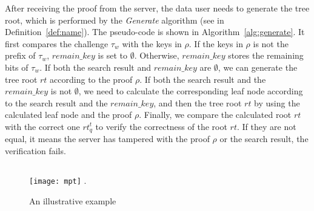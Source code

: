 After receiving the proof from the server, the data user needs to generate the tree root, which is performed by the {\it Generate} algorithm (see in Definition~\ref{def:name}). The pseudo-code is shown in Algorithm~\ref{alg:generate}. It first compares the challenge $\tau_{w}$ with the keys in $\rho$. If the keys in $\rho$ is not the prefix of $\tau_{w}$, $remain\_key$ is set to $\emptyset$. Otherwise, $remain\_key$ stores the remaining bits of $\tau_{w}$. If both the search result and $remain\_key$ are $\emptyset$, we can generate the tree root $rt$ according to the proof $\rho$. If both the search result and the $remain\_key$ is not $\emptyset$, we need to calculate the corresponding leaf node according to the search result and the $remain\_key$, and then  the tree root $rt$ by using the calculated leaf node and the proof $\rho$.  Finally, we compare the calculated root $rt$ with the correct one $rt^t_q$ to verify the correctness of the root $rt$. If they are not equal, it means the server has tampered with  the proof $\rho$ or the search result,  the verification fails.

\subsection{}

  \begin{figure*}[t]
  \centering
  \texttt{[image: mpt]}
  \DeclareGraphicsExtensions.
  \caption{An illustrative example}
  \label{fig:mpt}
  \end{figure*}

